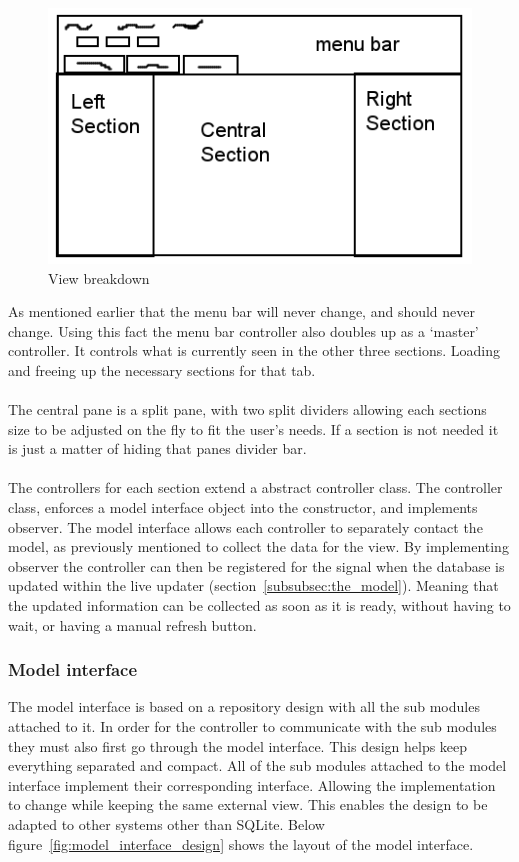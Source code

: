\begin{figure}[H]
	\centering
	\includegraphics[scale=0.5]{images/view_breakdown.png}
	\caption{View breakdown}
	\label{fig:view_breakdown}
\end{figure}

As mentioned earlier that the menu bar will never change, and should never change. Using this fact the menu bar controller also doubles up as a `master' controller. It controls what is currently seen in the other three sections. Loading and freeing up the necessary sections for that tab. 
\\\\
The central pane is a split pane, with two split dividers allowing each sections size to be adjusted on the fly to fit the user's needs. If a section is not needed it is just a matter of hiding that panes divider bar. 
\\\\
The controllers for each section extend a abstract controller class. The controller class, enforces a model interface object into the constructor, and implements observer. The model interface allows each controller to separately contact the model, as previously mentioned to collect the data for the view. By implementing observer the controller can then be registered for the signal when the database is updated within the live updater (section~\ref{subsubsec:the_model}). Meaning that the updated information can be collected as soon as it is ready, without having to wait, or having a manual refresh button.    

\subsubsection{Model interface}
\label{subsubsec:imp_model_interface}

The model interface is based on a repository design with all the sub modules attached to it. In order for the controller to communicate with the sub modules they must also first go through the model interface. This design helps keep everything separated and compact. All of the sub modules attached to the model interface implement their corresponding interface. Allowing the implementation to change while keeping the same external view. This enables the design to be adapted to other systems other than SQLite. Below figure~\ref{fig:model_interface_design} shows the layout of the model interface.

